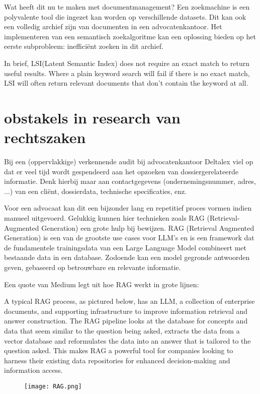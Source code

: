 Wat heeft dit nu te maken met documentmanagement? Een zoekmachine is een polyvalente tool die ingezet kan worden op verschillende datasets. Dit kan ook een volledig archief zijn van
documenten in een advocatenkantoor. Het implementeren van een semantisch zoekalgoritme kan een oplossing bieden op het eerste subprobleem: inefficiënt zoeken in dit archief.

\begin{displayquote}
	In brief, LSI(Latent Semantic Index) does not require an exact match to return useful results.
	Where a plain keyword search will fail if there is no exact match,
	LSI will often return relevant documents that don’t contain the keyword at all. \autocite{MediumSemanticSearch}
\end{displayquote}

\section{obstakels in research van rechtszaken}
Bij een (oppervlakkige) verkennende audit bij advocatenkantoor Deltalex viel op dat er veel tijd wordt gespendeerd aan het opzoeken van dossiergerelateerde informatie. Denk hierbij maar aan
contactgegevens (ondernemingsnummer, adres, ...) van een cliënt, dossierdata, technische specificaties, enz.

Voor een advocaat kan dit een bijzonder lang en repetitief proces vormen indien manueel uitgevoerd. Gelukkig kunnen hier technieken zoals RAG (Retrieval-Augmented Generation) een grote hulp
bij bewijzen. RAG (Retrieval Augmented Generation) is een van de grootste use cases voor LLM's en is een framework dat de fundamentele trainingsdata van een Large Language Model
combineert met bestaande data in een database. Zodoende kan een model gegronde antwoorden geven, gebaseerd op betrouwbare en relevante informatie.

Een quote van Medium legt uit hoe RAG werkt in grote lijnen:

\begin{displayquote}
	A typical RAG process, as pictured below, has an LLM, a collection of enterprise documents, and supporting infrastructure to improve information retrieval and answer construction.
	The RAG pipeline looks at the database for concepts and data that seem similar to the question being asked, extracts the data from a vector database and reformulates the data into
	an answer that is tailored to the question asked. This makes RAG a powerful tool for companies looking to harness their existing data repositories for enhanced decision-making
	and information access. \autocite{MediumRAG}
	\begin{figure}[h]
		\texttt{[image: RAG.png]}
		\centering
	\end{figure}
\end{displayquote}
\newpage

